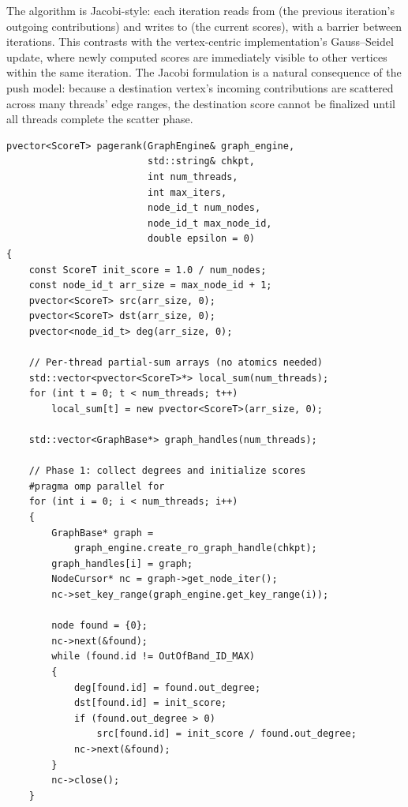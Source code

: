 The algorithm is Jacobi-style: each iteration reads from  (the previous iteration's outgoing contributions) and writes to  (the current scores), with a barrier between iterations.
This contrasts with the vertex-centric implementation's Gauss--Seidel update, where newly computed scores are immediately visible to other vertices within the same iteration.
The Jacobi formulation is a natural consequence of the push model: because a destination vertex's incoming contributions are scattered across many threads' edge ranges, the destination score cannot be finalized until all threads complete the scatter phase.

\begin{lstlisting}[style=cpp, label={lst:pagerank_ec}, caption={Edge-centric PageRank using the \api{}.  Each thread streams its edge partition via \code{EdgeCursor}, accumulates into a private array, and a merge phase reduces across threads.  Compare with the vertex-centric implementation in~\autoref{lst:pagerank_graphapi}.}, captionpos=b]
pvector<ScoreT> pagerank(GraphEngine& graph_engine,
                         std::string& chkpt,
                         int num_threads,
                         int max_iters,
                         node_id_t num_nodes,
                         node_id_t max_node_id,
                         double epsilon = 0)
{
    const ScoreT init_score = 1.0 / num_nodes;
    const node_id_t arr_size = max_node_id + 1;
    pvector<ScoreT> src(arr_size, 0);
    pvector<ScoreT> dst(arr_size, 0);
    pvector<node_id_t> deg(arr_size, 0);

    // Per-thread partial-sum arrays (no atomics needed)
    std::vector<pvector<ScoreT>*> local_sum(num_threads);
    for (int t = 0; t < num_threads; t++)
        local_sum[t] = new pvector<ScoreT>(arr_size, 0);

    std::vector<GraphBase*> graph_handles(num_threads);

    // Phase 1: collect degrees and initialize scores
    #pragma omp parallel for
    for (int i = 0; i < num_threads; i++)
    {
        GraphBase* graph =
            graph_engine.create_ro_graph_handle(chkpt);
        graph_handles[i] = graph;
        NodeCursor* nc = graph->get_node_iter();
        nc->set_key_range(graph_engine.get_key_range(i));

        node found = {0};
        nc->next(&found);
        while (found.id != OutOfBand_ID_MAX)
        {
            deg[found.id] = found.out_degree;
            dst[found.id] = init_score;
            if (found.out_degree > 0)
                src[found.id] = init_score / found.out_degree;
            nc->next(&found);
        }
        nc->close();
    }


\end{lstlisting}
